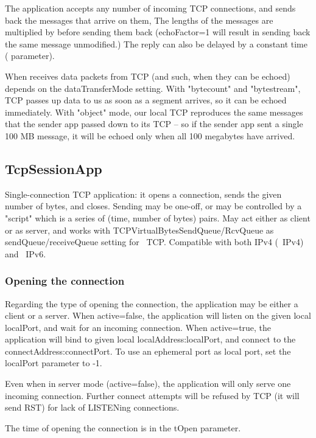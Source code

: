 The  application accepts any number of incoming TCP
connections, and sends back the messages that arrive on them, The lengths of the
messages are multiplied by  before sending them back (echoFactor=1
will result in sending back the same message unmodified.) The reply can also be
delayed by a constant time ( parameter).

When  receives data packets from TCP (and such, when they can be
echoed) depends on the dataTransferMode setting.
With "bytecount" and "bytestream", TCP passes up data to us
as soon as a segment arrives, so it can be echoed immediately.
With "object" mode, our local TCP reproduces the same
messages that the sender app passed down to its TCP -- so if the sender
app sent a single 100 MB message, it will be echoed only when all
100 megabytes have arrived.

\subsection{TcpSessionApp}

Single-connection TCP application: it opens a connection, sends
the given number of bytes, and closes. Sending may be one-off,
or may be controlled by a "script" which is a series of
(time, number of bytes) pairs. May act either as client or as server,
and works with TCPVirtualBytesSendQueue/RcvQueue as sendQueue/receiveQueue
setting for ~TCP.
Compatible with both IPv4 (~IPv4) and ~IPv6.

\subsubsection*{Opening the connection}

Regarding the type of opening the connection, the application may
be either a client or a server. When active=false, the application
will listen on the given local localPort, and wait for an incoming connection.
When active=true, the application will bind to given local localAddress:localPort,
and connect to the connectAddress:connectPort. To use an ephemeral port
as local port, set the localPort parameter to -1.

Even when in server mode (active=false), the application will only
serve one incoming connection. Further connect attempts will be
refused by TCP (it will send RST) for lack of LISTENing connections.

The time of opening the connection is in the tOpen parameter.


